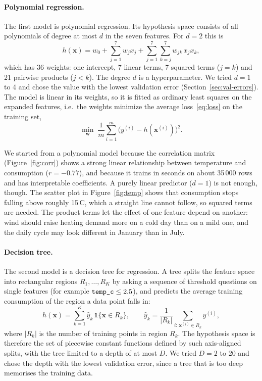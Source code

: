 \documentclass[10pt,a4paper]{article}
\newcommand{\feat}[1]{\texttt{\detokenize{#1}}}
\begin{document}
\paragraph{Polynomial regression.}
The first model is polynomial regression. Its hypothesis space consists of all polynomials
of degree at most $d$ in the seven features. For $d = 2$ this is
\begin{equation}
  h(\mathbf{x}) = w_0 + \sum_{j=1}^{7} w_j x_j + \sum_{j=1}^{7} \sum_{k=j}^{7} w_{jk}\, x_j x_k,
  \label{eq:poly}
\end{equation}
which has 36 weights: one intercept, 7 linear terms, 7 squared terms ($j = k$) and 21
pairwise products ($j < k$). The degree $d$ is a hyperparameter. We tried $d = 1$ to $4$
and chose the value with the lowest validation error (Section~\ref{sec:val-errors}). The
model is linear in its weights, so it is fitted as ordinary least squares on the expanded
features, i.e.\ the weights minimize the average loss~\eqref{eq:loss} on the training set,
\begin{equation}
  \min_{\mathbf{w}} \; \frac{1}{m} \sum_{i=1}^{m} \bigl( y^{(i)} - h(\mathbf{x}^{(i)}) \bigr)^2 .
  \label{eq:erm}
\end{equation}

We started from a polynomial model because the correlation matrix (Figure~\ref{fig:corr})
shows a strong linear relationship between temperature and consumption ($r = -0.77$), and
because it trains in seconds on about 35\,000 rows and has interpretable coefficients. A
purely linear predictor ($d = 1$) is not enough, though. The scatter plot in
Figure~\ref{fig:temp} shows that consumption stops falling above roughly
15\,\textdegree C, which a straight line cannot follow, so squared terms are needed. The
product terms let the effect of one feature depend on another: wind should raise heating
demand more on a cold day than on a mild one, and the daily cycle may look different in
January than in July.

\paragraph{Decision tree.}
The second model is a decision tree for regression. A tree splits the feature space into
rectangular regions $R_1, \dots, R_K$ by asking a sequence of threshold questions on single
features (for example $\feat{temp_c} \le 2.5$), and predicts the average training
consumption of the region a data point falls in:
\begin{equation}
  h(\mathbf{x}) = \sum_{k=1}^{K} \hat{y}_k \, \mathbb{1}\{\mathbf{x} \in R_k\},
  \qquad
  \hat{y}_k = \frac{1}{|R_k|} \sum_{i:\, \mathbf{x}^{(i)} \in R_k} y^{(i)},
  \label{eq:tree}
\end{equation}
where $|R_k|$ is the number of training points in region $R_k$. The hypothesis space is
therefore the set of piecewise constant functions defined by such axis-aligned splits, with
the tree limited to a depth of at most $D$. We tried $D = 2$ to $20$ and chose the depth with
the lowest validation error, since a tree that is too deep memorises the training data.
\end{document}
